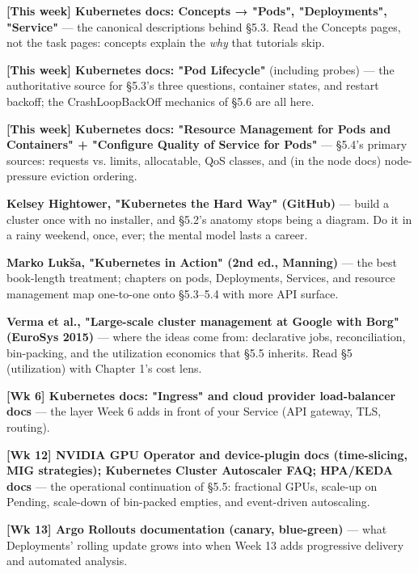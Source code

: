 \begin{tbbitemize}
  \item \textbf{[This week] Kubernetes docs: Concepts → "Pods", "Deployments", "Service"} — the canonical descriptions behind §5.3. Read the Concepts pages, not the task pages: concepts explain the \textit{why} that tutorials skip.
  \item \textbf{[This week] Kubernetes docs: "Pod Lifecycle"} (including probes) — the authoritative source for §5.3's three questions, container states, and restart backoff; the CrashLoopBackOff mechanics of §5.6 are all here.
  \item \textbf{[This week] Kubernetes docs: "Resource Management for Pods and Containers" + "Configure Quality of Service for Pods"} — §5.4's primary sources: requests vs. limits, allocatable, QoS classes, and (in the node docs) node-pressure eviction ordering.
  \item \textbf{Kelsey Hightower, "Kubernetes the Hard Way" (GitHub)} — build a cluster once with no installer, and §5.2's anatomy stops being a diagram. Do it in a rainy weekend, once, ever; the mental model lasts a career.
  \item \textbf{Marko Lukša, "Kubernetes in Action" (2nd ed., Manning)} — the best book-length treatment; chapters on pods, Deployments, Services, and resource management map one-to-one onto §5.3–5.4 with more API surface.
  \item \textbf{Verma et al., "Large-scale cluster management at Google with Borg" (EuroSys 2015)} — where the ideas come from: declarative jobs, reconciliation, bin-packing, and the utilization economics that §5.5 inherits. Read §5 (utilization) with Chapter 1's cost lens.
  \item \textbf{[Wk 6] Kubernetes docs: "Ingress" and cloud provider load-balancer docs} — the layer Week 6 adds in front of your Service (API gateway, TLS, routing).
  \item \textbf{[Wk 12] NVIDIA GPU Operator and device-plugin docs (time-slicing, MIG strategies); Kubernetes Cluster Autoscaler FAQ; HPA/KEDA docs} — the operational continuation of §5.5: fractional GPUs, scale-up on Pending, scale-down of bin-packed empties, and event-driven autoscaling.
  \item \textbf{[Wk 13] Argo Rollouts documentation (canary, blue-green)} — what Deployments' rolling update grows into when Week 13 adds progressive delivery and automated analysis.
\end{tbbitemize}

